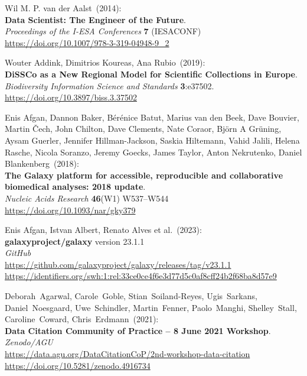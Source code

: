 
\makeatletter
{}

\begin{thebibliography}{9}

\small


Wil M. P. van der Aalst~(2014):\\
\textbf{Data Scientist: The Engineer of the Future}.\\
\emph{Proceedings of the I-ESA Conferences} \textbf{7} (IESACONF) \\
\url{https://doi.org/10.1007/978-3-319-04948-9_2}

Wouter Addink, Dimitrios Koureas, Ana Rubio~(2019): \\
\textbf{DiSSCo as a New Regional Model for Scientific Collections in Europe}.\\
\emph{Biodiversity Information Science and Standards}
\textbf{3}:e37502.\\
\url{https://doi.org/10.3897/biss.3.37502}

Enis Afgan, Dannon Baker, Bérénice Batut, Marius van den Beek, Dave Bouvier, Martin Čech, John Chilton, Dave Clements, Nate Coraor, Björn A Grüning, Aysam Guerler, Jennifer Hillman-Jackson, Saskia Hiltemann, Vahid Jalili, Helena Rasche, Nicola Soranzo, Jeremy Goecks, James Taylor, Anton Nekrutenko, Daniel Blankenberg~(2018): \\
\textbf{The Galaxy platform for accessible, reproducible and collaborative biomedical analyses: 2018 update}.\\
\emph{Nucleic Acids Research} \textbf{46}(W1) W537--W544\\
\url{https://doi.org/10.1093/nar/gky379}

Enis Afgan, Istvan Albert, Renato Alves et al.~(2023): \\
\textbf{galaxyproject/galaxy} version 23.1.1\\
\emph{GitHub}\\
\url{https://github.com/galaxyproject/galaxy/releases/tag/v23.1.1}\\
\url{https://identifiers.org/swh:1:rel:33ce0ce4f6e3d77d5c0af8cff24b2f68ba8d57e9}

Deborah~Agarwal, Carole~Goble, Stian~Soiland-Reyes, Ugis~Sarkans, Daniel~Noesgaard, Uwe~Schindler, Martin~Fenner, Paolo~Manghi, Shelley~Stall, Caroline~Coward, Chris~Erdmann~(2021): \\
\textbf{Data Citation Community of Practice -- 8 June 2021 Workshop}.\\
\emph{Zenodo/AGU}\\
\url{https://data.agu.org/DataCitationCoP/2nd-workshop-data-citation}\\
\url{https://doi.org/10.5281/zenodo.4916734}


\end{thebibliography}
